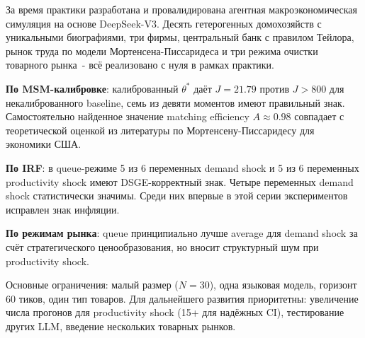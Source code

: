 \documentclass[12pt, a4paper]{article}
\begin{document}
За время практики разработана и провалидирована агентная макроэкономическая симуляция на основе DeepSeek-V3. Десять гетерогенных домохозяйств с уникальными биографиями, три фирмы, центральный банк с правилом Тейлора, рынок труда по модели Мортенсена-Писсаридеса и три режима очистки товарного рынка~- всё реализовано с нуля в рамках практики.

\textbf{По MSM-калибровке}: калиброванный $\theta^*$ даёт $J = 21.79$ против $J > 800$ для некалиброванного baseline, семь из девяти моментов имеют правильный знак. Самостоятельно найденное значение matching efficiency $A \approx 0.98$ совпадает с теоретической оценкой из литературы по Мортенсену-Писсаридесу для экономики США.

\textbf{По IRF}: в queue-режиме 5 из 6 переменных demand shock и 5 из 6 переменных productivity shock имеют DSGE-корректный знак. Четыре переменных demand shock статистически значимы. Среди них впервые в этой серии экспериментов исправлен знак инфляции.


\textbf{По режимам рынка}: queue принципиально лучше average для demand shock за счёт стратегического ценообразования, но вносит структурный шум при productivity shock.

Основные ограничения: малый размер ($N = 30$), одна языковая модель, горизонт 60 тиков, один тип товаров. Для дальнейшего развития приоритетны: увеличение числа прогонов для productivity shock (15+ для надёжных CI), тестирование других LLM, введение нескольких товарных рынков.

\clearpage

\end{document}

